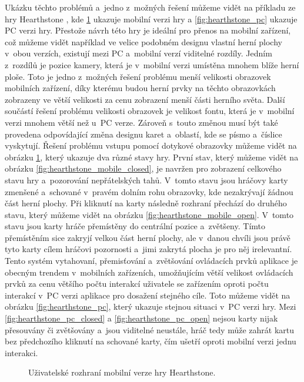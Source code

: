 Ukázku těchto problémů a~jedno z~možných řešení můžeme vidět na příkladu ze hry Hearthstone \citep{site:hearthstone}, kde  \ref{fig:hearthstone_mobile} ukazuje mobilní verzi hry a \ref{fig:hearthstone_pc} ukazuje PC verzi hry. Přestože návrh této hry je ideální pro přenos na mobilní zařízení, což můžeme vidět například ve velice podobném designu vlastní herní plochy v~obou verzích, existují mezi PC a~mobilní verzí viditelné rozdíly. Jedním z~rozdílů je pozice kamery, která je v~mobilní verzi umístěna mnohem blíže herní ploše. Toto je jedno z~možných řešení problému menší velikosti obrazovek mobilních zařízení, díky kterému budou herní prvky na těchto obrazovkách zobrazeny ve větší velikosti za cenu zobrazení menší části herního světa. Další součástí řešení problému velikosti obrazovek je velikost fontu, která je v~mobilní verzi mnohem větší než u~PC verze. Zároveň s~touto změnou musí být také provedena odpovídající změna designu karet a~oblastí, kde se písmo a~číslice vyskytují. Řešení problému vstupu pomocí dotykové obrazovky můžeme vidět na obrázku \ref{fig:hearthstone_mobile}, který ukazuje dva různé stavy hry. První stav, který můžeme vidět na obrázku \ref{fig:hearthstone_mobile_closed}, je navržen pro zobrazení celkového stavu hry a~pozorování nepřátelských tahů. V~tomto stavu jsou hráčovy karty zmenšené a~schované v~pravém dolním rohu obrazovky, kde nezakrývají žádnou část herní plochy. Při kliknutí na karty následně rozhraní přechází do druhého stavu, který můžeme vidět na obrázku \ref{fig:hearthstone_mobile_open}. V~tomto stavu jsou karty hráče přemístěny do centrální pozice a~zvětšeny. Tímto přemístěním sice zakryjí velkou část herní plochy, ale v~danou chvíli jsou právě tyto karty cílem hráčovi pozornosti a~jimi zakrytá plocha je pro něj irelevantní. Tento systém vytahovaní, přemisťování a~zvětšování ovládacích prvků aplikace je obecným trendem v~mobilních zařízeních, umožňujícím větší velikost ovládacích prvků za cenu většího počtu interakcí uživatele se zařízením oproti počtu interakcí v~PC verzi aplikace pro dosažení stejného cíle. Toto můžeme vidět na obrázku \ref{fig:hearthstone_pc}, který ukazuje stejnou situaci v~PC verzi hry. Mezi \ref{fig:hearthstone_pc_closed} a \ref{fig:hearthstone_pc_open} nejsou karty nijak přesouvány či zvětšovány a~jsou viditelné neustále, hráč tedy může zahrát kartu bez předchozího kliknutí na schované karty, čím ušetří oproti mobilní verzi jednu interakci.
\begin{figure}[!tbp]
	\centering
	\hfill
	\caption{Uživatelské rozhraní mobilní verze hry Hearthstone.}
	\label{fig:hearthstone_mobile}
\end{figure}

